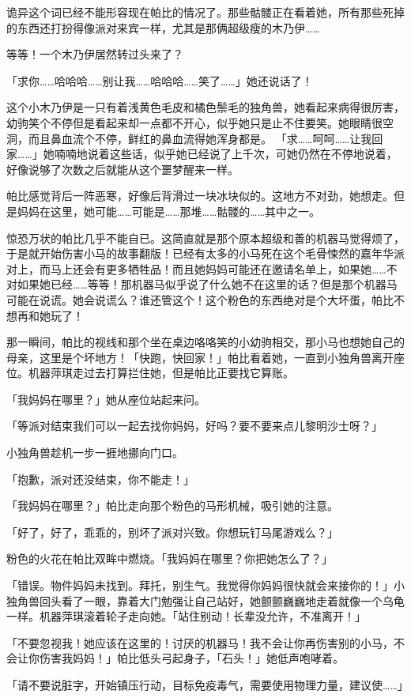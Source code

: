 诡异这个词已经不能形容现在帕比的情况了。那些骷髅正在看着她，所有那些死掉的东西还打扮得像派对来宾一样，尤其是那俩超级瘦的木乃伊……

等等！一个木乃伊居然转过头来了？

「求你……哈哈哈……别让我……哈哈哈……笑了……」她还说话了！

这个小木乃伊是一只有着浅黄色毛皮和橘色鬃毛的独角兽，她看起来病得很厉害，幼驹笑个不停但是看起来却一点都不开心，似乎她只是止不住要笑。她眼睛很空洞，而且鼻血流个不停，鲜红的鼻血流得她浑身都是。
「求……呵呵……让我回家……」她喃喃地说着这些话，似乎她已经说了上千次，可她仍然在不停地说着，好像说够了次数之后就能从这个噩梦醒来一样。

帕比感觉背后一阵恶寒，好像后背滑过一块冰块似的。这地方不对劲，她想走。但是妈妈在这里，她可能……可能是……那堆……骷髅的……其中之一。

惊恐万状的帕比几乎不能自已。这简直就是那个原本超级和善的机器马觉得烦了，于是就开始伤害小马的故事翻版！已经有太多的小马死在这个毛骨悚然的嘉年华派对上，而马上还会有更多牺牲品！而且她妈妈可能还在邀请名单上，如果她……不对如果她已经……等等！那机器马似乎说了什么她不在这里的话？但是那个机器马可能在说谎。她会说谎么？谁还管这个！这个粉色的东西绝对是个大坏蛋，帕比不想再和她玩了！

那一瞬间，帕比的视线和那个坐在桌边咯咯笑的小幼驹相交，那小马也想她自己的母亲，这里是个坏地方！「快跑，快回家！」帕比看着她，一直到小独角兽离开座位。机器萍琪走过去打算拦住她，但是帕比正要找它算账。

「我妈妈在哪里？」她从座位站起来问。

「等派对结束我们可以一起去找你妈妈，好吗？要不要来点儿黎明沙士呀？」

小独角兽趁机一步一捱地挪向门口。

「抱歉，派对还没结束，你不能走！」

「我妈妈在哪里？」帕比走向那个粉色的马形机械，吸引她的注意。

「好了，好了，乖乖的，别坏了派对兴致。你想玩钉马尾游戏么？」

粉色的火花在帕比双眸中燃烧。「我妈妈在哪里？你把她怎么了？」

「错误。物件妈妈未找到。拜托，别生气。我觉得你妈妈很快就会来接你的！」小独角兽回头看了一眼，靠着大门勉强让自己站好，她颤颤巍巍地走着就像一个乌龟一样。机器萍琪滚着轮子走向她。「站住别动！长辈没允许，不准离开！」

「不要忽视我！她应该在这里的！讨厌的机器马！我不会让你再伤害别的小马，不会让你伤害我妈妈！」帕比低头弓起身子，「石头！」她低声咆哮着。

「请不要说脏字，开始镇压行动，目标免疫毒气，需要使用物理力量，建议使……」

